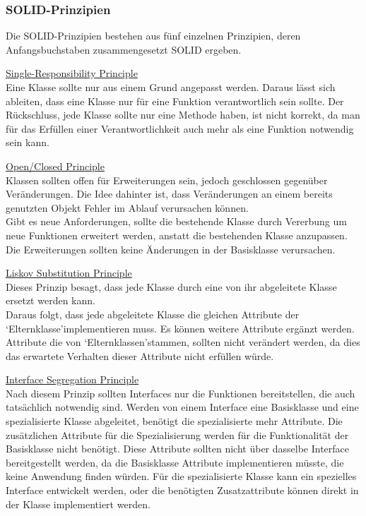 \subsubsection{SOLID-Prinzipien}
Die SOLID-Prinzipien bestehen aus fünf einzelnen Prinzipien, deren Anfangsbuchstaben zusammengesetzt SOLID ergeben\cite{sarcar2021use}.\noindent
\begin{description}
\item{\underline{Single-Responsibility Principle}}\hfill\\
Eine Klasse sollte nur aus einem Grund angepasst werden. Daraus lässt sich ableiten, dass eine Klasse nur für eine Funktion verantwortlich sein sollte. Der Rückschluss, jede Klasse sollte nur eine Methode haben, ist nicht korrekt, da man für das Erfüllen einer Verantwortlichkeit auch mehr als eine Funktion notwendig sein kann\cite{sarcar2021use}.
\item{\underline{Open/Closed Principle}}\hfill\\
Klassen sollten offen für Erweiterungen sein, jedoch geschlossen gegenüber Veränderungen. Die Idee dahinter ist, dass Veränderungen an einem bereits genutzten Objekt Fehler im Ablauf verursachen können. \\Gibt es neue Anforderungen, sollte die bestehende Klasse durch Vererbung um neue Funktionen erweitert werden, anstatt die bestehenden Klasse anzupassen. Die Erweiterungen sollten keine Änderungen in der Basisklasse verursachen\cite{sarcar2021use}. \noindent
\item{\underline{Liskov Substitution Principle}}\hfill\\
Dieses Prinzip besagt, dass jede Klasse durch eine von ihr abgeleitete Klasse ersetzt werden kann\cite{sarcar2021use}.\\
Daraus folgt, dass jede abgeleitete Klasse die gleichen Attribute der \lq Elternklasse\rq\space implementieren muss. Es können weitere Attribute ergänzt werden. Attribute die von \lq Elternklassen\rq\space stammen, sollten nicht verändert werden, da dies das erwartete Verhalten dieser Attribute nicht erfüllen würde.\noindent
\item{\underline{Interface Segregation Principle}}\hfill\\
Nach diesem Prinzip sollten Interfaces nur die Funktionen bereitstellen, die auch tatsächlich notwendig sind\cite{sarcar2021use}. Werden von einem Interface eine Basisklasse und eine spezialisierte Klasse abgeleitet, benötigt die spezialisierte mehr Attribute. Die zusätzlichen Attribute für die Spezialisierung werden für die Funktionalität der Basisklasse nicht benötigt. Diese Attribute sollten nicht über dasselbe Interface bereitgestellt werden, da die Basisklasse Attribute implementieren müsste, die keine Anwendung finden würden. Für die spezialisierte Klasse kann ein spezielles Interface entwickelt werden, oder die benötigten Zusatzattribute können direkt in der Klasse implementiert werden.\noindent

\end{description}
